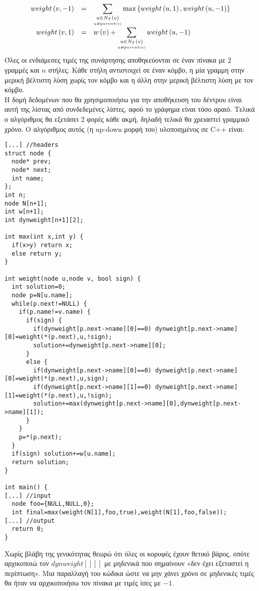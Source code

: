 \documentclass[12pt]{article}
\newcommand\en[1]{\latintext #1\greektext}
\begin{document}
$$\begin{array}{>{\displaystyle}rc>{\displaystyle}l}
weight\left(v,-1\right)&=&\sum_{\underset{u\neq parent(v)}{u\in N_T\left(v\right)}}\max\left\{weight\left(u,1\right),weight\left(u,-1\right)\right\}\\
weight\left(v,1\right)&=&w\left(v\right)+\sum_{\underset{u\neq parent(v)}{u\in N_T\left(v\right)}}weight\left(u,-1\right)\\
\end{array}$$
Όλες οι ενδιάμεσες τιμές της συνάρτησης αποθηκεύονται σε έναν πίνακα με $2$ γραμμές και $n$ στήλες. Κάθε στήλη αντιστοιχεί σε έναν κόμβο, η μία γραμμη στην μερική βέλτιστη λύση χωρίς τον κόμβο και η άλλη στην μερική βέλτιστη λύση με τον κόμβο.\\
Η δομή δεδομένων που θα χρησιμοποιήσω για την αποθήκευση του δέντρου είναι αυτή της λίστας από συνδεδεμένες λίστες, αφού το γράφημα είναι τόσο αραιό. Τελικά ο αλγόριθμος θα εξετάσει 2 φορές κάθε ακμή, δηλαδή τελικά θα χρειαστεί γραμμικό χρόνο. Ο αλγόριθμος αυτός (η \en{up-down} μορφή του) υλοποιημένος σε \en{C++} είναι:
\latintext\begin{lstlisting}
[...] //headers
struct node {
  node* prev;
  node* next;
  int name;
};
int n;
node N[n+1];
int w[n+1];
int dynweight[n+1][2];

int max(int x,int y) {
  if(x>y) return x;
  else return y;
}

int weight(node u,node v, bool sign) {
  int solution=0;
  node p=N[u.name];
  while(p.next!=NULL) {
    if(p.name!=v.name) {
      if(sign) {
        if(dynweight[p.next->name][0]==0) dynweight[p.next->name][0]=weight(*(p.next),u,!sign);
        solution+=dynweight[p.next->name][0];
      }
      else {
        if(dynweight[p.next->name][0]==0) dynweight[p.next->name][0]=weight(*(p.next),u,sign);
        if(dynweight[p.next->name][1]==0) dynweight[p.next->name][1]=weight(*(p.next),u,!sign);
        solution+=max(dynweight[p.next->name][0],dynweight[p.next->name][1]);
      }
    }
    p=*(p.next);
  }
  if(sign) solution+=w[u.name];
  return solution;
}

int main() {
[...] //input
  node foo={NULL,NULL,0};
  int final=max(weight(N[1],foo,true),weight(N[1],foo,false));
[...] //output
  return 0;
}\end{lstlisting}\greektext
Χωρίς βλάβη της γενικότητας θεωρώ ότι όλες οι κορυφές έχουν θετικό βάρος, οπότε αρχικοποιώ τον $dynweight[][]$ με μηδενικά που σημαίνουν «δεν έχει εξεταστεί η περίπτωση». Μια παραλλαγή του κώδικα ώστε να μην χάνει χρόνο σε μηδενικές τιμές θα ήταν να αρχικοποιήσω τον πίνακα με τιμές ίσες με $-1$.\\
\end{document}
